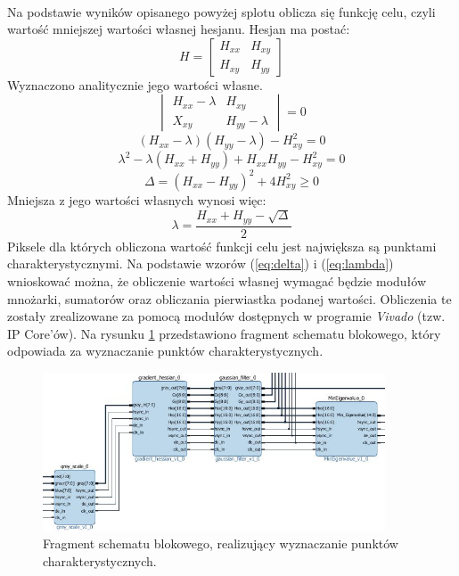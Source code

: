 \paragraph*{}
Na podstawie wyników opisanego powyżej splotu oblicza się funkcję celu, czyli wartość mniejszej wartości własnej hesjanu. Hesjan ma postać:
\begin{equation}
H=
	\begin{bmatrix}
	H_{xx} & H_{xy}\\
	H_{xy} & H_{yy}
	\end{bmatrix}
\end{equation}
Wyznaczono analitycznie jego wartości własne.
\begin{equation}
\begin{vmatrix}
H_{xx}-\lambda & H_{xy} \\
X_{xy} & H_{yy}-\lambda
\end{vmatrix}=0
\end{equation}
\begin{equation}
(H_{xx}-\lambda)(H_{yy}-\lambda)-H_{xy}^2=0
\end{equation}
\begin{equation}
\lambda^2-\lambda(H_{xx}+H_{yy})+H_{xx}H_{yy}-H_{xy}^2=0
\end{equation}
\begin{equation}
\label{eq:delta}
\Delta=(H_{xx}-H_{yy})^2+4H_{xy}^2 \geqslant 0
\end{equation}
Mniejsza z jego wartości własnych wynosi więc:
\begin{equation}
\label{eq:lambda}
\lambda=\frac{H_{xx}+H_{yy}-\sqrt{\Delta}}{2}
\end{equation}
Piksele dla których obliczona wartość funkcji celu jest największa są punktami charakterystycznymi. Na podstawie wzorów (\ref{eq:delta}) i (\ref{eq:lambda}) wnioskować można, że obliczenie wartości własnej wymagać będzie modułów mnożarki, sumatorów oraz obliczania pierwiastka podanej wartości.
Obliczenia te zostały zrealizowane za pomocą modułów dostępnych w programie \textit{Vivado} (tzw. IP Core'ów). Na rysunku \ref{fig:mineig_vivado} przedstawiono fragment schematu blokowego, który odpowiada za wyznaczanie punktów charakterystycznych.

\begin{figure}[H]
	\centering
	\includegraphics[width=4in]{mineig_vivado.jpg}
	\caption{Fragment schematu blokowego, realizujący wyznaczanie punktów charakterystycznych.}
	\label{fig:mineig_vivado}
\end{figure}

